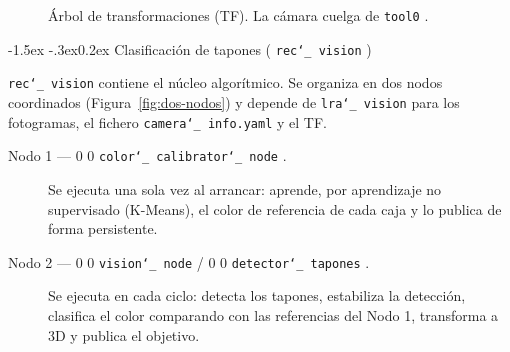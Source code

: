 \documentclass[12pt,a4paper]{article}
\makeatletter
\renewcommand\subsubsection{\@startsection{subsubsection}{3}{\z@}%
  {-1.5ex \@plus -.3ex}{0.2ex}%
  {\normalsize\bfseries\color{MediumBlue}}}
\newcommand{\code}[1]{%
  \begingroup
  \def\_{\char`_\penalty0 }%
  \def\/{\char`/\penalty0 }%
  \texttt{\small #1}%
  \endgroup}
\makeatother
\begin{document}
\begin{figure}[H]
\centering
{}
\caption{Árbol de transformaciones (TF). La cámara cuelga de \code{tool0}.}
\label{fig:tf}
\end{figure}


\subsubsection{Clasificación de tapones (\texorpdfstring{\code{rec\_vision}}{rec\_vision})}
\label{sec:rec-vision}

\code{rec\_vision} contiene el núcleo algorítmico. Se organiza en dos nodos coordinados (Figura~\ref{fig:dos-nodos})
y depende de \code{lra\_vision} para los fotogramas, el fichero
\code{camera\_info.yaml} y el TF.

\clearpage
\begin{description}
\item[Nodo 1 --- \code{color\_calibrator\_node}.] Se ejecuta una sola vez
al arrancar: aprende, por aprendizaje no supervisado (K-Means), el color de
referencia de cada caja y lo publica de forma persistente.
\item[Nodo 2 --- \code{vision\_node} / \code{detector\_tapones}.] Se ejecuta en
cada ciclo: detecta los tapones, estabiliza la detección, clasifica el color
comparando con las referencias del Nodo 1, transforma a 3D y publica el objetivo.
\end{description}
\end{document}
